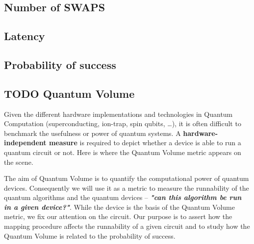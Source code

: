 \subsection*{Number of SWAPS}
\label{sec:orgde04061}
\subsection*{Latency}
\label{sec:org12b0ae9}
\subsection*{Probability of success}
\label{sec:orgd48cb4c}
\subsection*{{\bfseries\sffamily TODO} Quantum Volume}
\label{sec:orgc4382f9}

Given the different hardware implementations and technologies in Quantum Computation (superconducting, ion-trap, spin qubits, \ldots{}), it is often difficult to benchmark the usefulness or power of quantum systems. 
A \textbf{hardware-independent measure} is required to depict whether a device is able to run a quantum circuit or not.
Here is where the Quantum Volume metric appears on the scene.

The aim of Quantum Volume is to quantify the computational power of quantum devices. 
Consequently we will use it as a metric to measure the runnability of the quantum algorithms and the quantum devices -- \emph{\textbf{"can this algorithm be run in a given device?"}}.
While the device is the basis of the Quantum Volume metric, we fix our attention on the circuit.
Our purpose is to assert how the mapping procedure affects the runnability of a given circuit and to study how the Quantum Volume is related to the probability of success.

